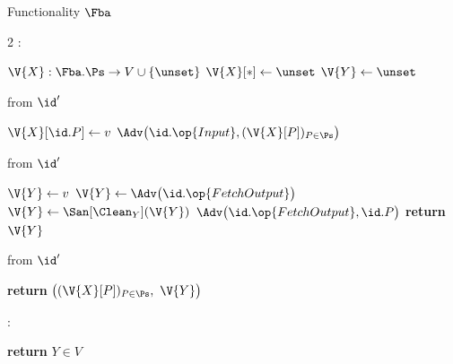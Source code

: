 \begin{interface}[nofloat]{Functionality $\Fba$ \\
}

{\scriptsize
\setlength{\columnsep}{1.4em}
\begin{multicols}{2}
:
\begin{algorithmic}[1]
\setcounter{contline}{0}\algcont
\State $\V{X} : \Fba.\Ps \to V \cup \{\unset\}$
\State $\V{X}[*] \gets \unset$
\State $\V{Y} \gets \unset$
\algsave
\end{algorithmic}
\vspace{1.4ex}

 \quad from $\id'$
\begin{algorithmic}[1]
\algcont
{}
\State $\V{X}[\id.P] \gets v$
\State $\Adv\bigl(\id.\op{Input}, (\V{X}[P])_{P \in \Ps}\bigr)$
\algsave
\end{algorithmic}
\vspace{1.4ex}

\columnbreak

 \quad from $\id'$
\begin{algorithmic}[1]
\algcont
{}
    \State $\V{Y} \gets v$
  \EndIf
    \State $\V{Y} \gets \Adv\bigl(\id.\op{FetchOutput}\bigr)$
    \State $\V{Y} \gets \San[\Clean_{Y}](\V{Y})$
  \EndIf
\EndIf
\State $\Adv\bigl(\id.\op{FetchOutput}, \id.P\bigr)$
\State \textbf{return} $\V{Y}$
\algsave
\end{algorithmic}
\vspace{1.4ex}

 \quad from $\id'$
\begin{algorithmic}[1]
\algcont
\State \textbf{return} $\bigl((\V{X}[P])_{P \in \Ps},\ \V{Y}\bigr)$
\algsave
\end{algorithmic}
\vspace{1.4ex}

:
\begin{algorithmic}[1]
\algcont
\State \textbf{return} $Y \in V$
\algsave
\end{algorithmic}
\end{multicols}}
\end{interface}
